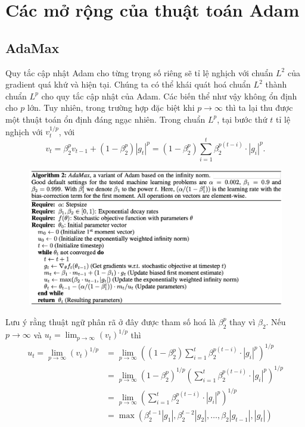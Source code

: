 \documentclass[11pt,oneside,a4paper]{report}
\theoremstyle{definition}
\begin{document}
\section{Các mở rộng của thuật toán Adam}
\subsection{AdaMax}
Quy tắc cập nhật Adam cho từng trọng số riêng sẽ tỉ lệ nghịch với chuẩn $L^2$ của gradient quá khứ và hiện tại. Chúng ta có thể khái quát hoá chuẩn $L^2$ thành chuẩn $L^p$ cho quy tắc cập nhật của Adam. Các biến thể như vậy không ổn định cho $p$ lớn. Tuy nhiên, trong trường hợp đặc biệt khi $p \rightarrow \infty$ thì ta lại thu được một thuật toán ổn định đáng ngạc nhiên. Trong chuẩn $L^p$, tại bước thứ $t$ tỉ lệ nghịch với $v_t^{1 / p}$, với
$$
v_t=\beta_2^p v_{t-1}+\left(1-\beta_2^p\right)\left|g_t\right|^p=\left(1-\beta_2^p\right) \sum_{i=1}^t \beta_2^{p(t-i)} \cdot\left|g_i\right|^p.
$$
\begin{figure}[!h]
\centering
\includegraphics[scale=0.35]{images/h2}
\end{figure}

Lưu ý rằng thuật ngữ phân rã ở đây được tham số hoá là $\beta_2^p$ thay vì $\beta_2$. Nếu $p \rightarrow \infty$  và $u_t=\lim _{p \rightarrow \infty}\left(v_t\right)^{1 / p}$ thì
$$
\begin{aligned}
u_t=\lim _{p \rightarrow \infty}\left(v_t\right)^{1 / p} &=\lim _{p \rightarrow \infty}\left(\left(1-\beta_2^p\right) \sum_{i=1}^t \beta_2^{p(t-i)} \cdot\left|g_i\right|^p\right)^{1 / p} \\
&=\lim _{p \rightarrow \infty}\left(1-\beta_2^p\right)^{1 / p}\left(\sum_{i=1}^t \beta_2^{p(t-i)} \cdot\left|g_i\right|^p\right)^{1 / p} \\
&=\lim _{p \rightarrow \infty}\left(\sum_{i=1}^t \beta_2^{p(t-i)} \cdot\left|g_i\right|^p\right)^{1 / p} \\
&=\max \left(\beta_2^{t-1}\left|g_1\right|, \beta_2^{t-2}\left|g_2\right|, \ldots, \beta_2\left|g_{t-1}\right|,\left|g_t\right|\right)
\end{aligned}
$$
\end{document}
